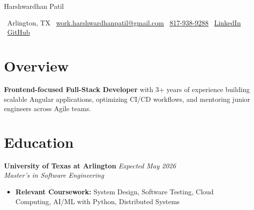 \documentclass[10pt, letterpaper]{article}
\newenvironment{highlights}{\begin{itemize}[topsep=0.10 cm, parsep=0.10 cm, partopsep=0pt, itemsep=2pt, leftmargin=10pt]}{\end{itemize}}
\begin{document}
\newcommand{\AND}{\unskip\cleaders\copy\ANDbox\hskip\wd\ANDbox\ignorespaces}
\newsavebox\ANDbox
\sbox\ANDbox{$|$}

\begin{center}
    {\fontsize{25 pt}{25 pt}\selectfont Harshwardhan Patil}

    \vspace{5 pt}
    \normalsize
    \faMapMarker*\ Arlington, TX\hspace{1.5em}
    \faEnvelope\ \href{mailto:work.harshwardhanpatil@gmail.com}{work.harshwardhanpatil@gmail.com}\hspace{1.5em}
    \faPhone\ \href{tel:8179389288}{817-938-9288}\hspace{1.5em}
    \faLinkedin\ \href{https://www.linkedin.com/in/harshwardhanpatil23/}{LinkedIn}\hspace{1.5em}
    \faGithub\ \href{https://github.com/buffden}{GitHub}
\end{center}

\vspace{0.3 cm}
\newcommand{\educationentry}[4]{%
  \noindent\textbf{#1} \hfill \textit{#2}\\
  \textit{#3} \\
  #4
}
\section{Overview}
\textbf{Frontend-focused Full-Stack Developer} with 3+ years of experience building scalable Angular applications, optimizing CI/CD workflows, and mentoring junior engineers across Agile teams.

\section{Education}
\educationentry
    {University of Texas at Arlington}
    {Expected May 2026}
    {Master’s in Software Engineering}
    {
    \begin{highlights}
        \item \textbf{Relevant Coursework:} System Design, Software Testing, Cloud Computing, AI/ML with Python, Distributed Systems
        \end{highlights}
    }
    
\end{document}
